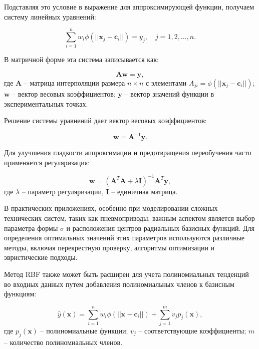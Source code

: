 Подставляя это условие в выражение для аппроксимирующей функции, получаем систему линейных уравнений:

\begin{equation}
\sum_{i=1}^{n} w_i \phi(||\mathbf{x}_j - \mathbf{c}_i||) = y_j, \quad j = 1, 2, \ldots, n.
\end{equation}

В матричной форме эта система записывается как:

\begin{equation}
\mathbf{A} \mathbf{w} = \mathbf{y},
\end{equation}
где $\mathbf{A}$ -- матрица интерполяции размера $n \times n$ с элементами $A_{ji} = \phi(||\mathbf{x}_j - \mathbf{c}_i||)$;
$\mathbf{w}$ -- вектор весовых коэффициентов;
$\mathbf{y}$ -- вектор значений функции в экспериментальных точках.

Решение системы уравнений дает вектор весовых коэффициентов:

\begin{equation}
\mathbf{w} = \mathbf{A}^{-1} \mathbf{y}.
\end{equation}

Для улучшения гладкости аппроксимации и предотвращения переобучения часто применяется регуляризация:

\begin{equation}
\mathbf{w} = (\mathbf{A}^T\mathbf{A} + \lambda \mathbf{I})^{-1} \mathbf{A}^T \mathbf{y},
\end{equation}
где $\lambda$ -- параметр регуляризации, $\mathbf{I}$ -- единичная матрица.

В практических приложениях, особенно при моделировании сложных технических
систем, таких как пневмоприводы, важным аспектом является выбор параметра формы $\sigma$ и
расположения центров радиальных базисных функций. Для определения оптимальных значений этих
параметров используются различные методы, включая перекрестную проверку, алгоритмы оптимизации и эвристические подходы.

Метод RBF также может быть расширен для учета полиномиальных тенденций во входных данных путем добавления полиномиальных членов к базисным функциям:

\begin{equation}
\hat{y}(\mathbf{x}) = \sum_{i=1}^{n} w_i \phi(||\mathbf{x} - \mathbf{c}_i||) + \sum_{j=1}^{m} v_j p_j(\mathbf{x}),
\end{equation}
где $p_j(\mathbf{x})$ -- полиномиальные функции;
$v_j$ -- соответствующие коэффициенты;
$m$ -- количество полиномиальных членов.

